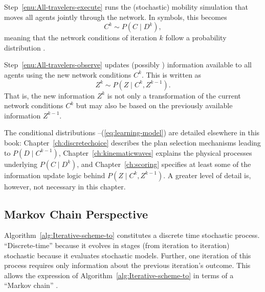
Step~\ref{enu:All-travelers-execute} runs the (stochastic) mobility
simulation that moves all agents jointly through the network. In symbols,
this becomes
\begin{equation}
C^{k}\sim P(C\mid D^{k}),\label{eq:network-loading-model}
\end{equation}\corr{,}{}
meaning that the network conditions of iteration $k$ follow a
probability distribution .

Step~\ref{enu:All-travelers-observe} updates  (possibly
) information available to all agents
using the new network conditions $C^{k}$. This is written as
\begin{equation}
Z^{k}\sim P(Z\mid C^{k},Z^{k-1}).\label{eq:learning-model}
\end{equation}
That is, the new information $Z^{k}$ is not only a transformation
of the current network conditions $C^{k}$\corr{,}{} but may also be based on
the previously available information $Z^{k-1}$.

The conditional distributions --(\ref{eq:learning-model})
are detailed elsewhere in this book: Chapter~\ref{ch:discretechoice} 
describes the plan selection mechanisms leading to $P(D\mid C^{k-1})$,
Chapter~\ref{ch:kinematicwaves} explains the physical processes underlying
$P(C\mid D^{k})$, and Chapter~\ref{ch:scoring}
specifies at least some of the information update logic behind $P(Z\mid
C^{k},Z^{k-1})$.
A greater level of detail is, however, not necessary in this chapter.


\subsection{\label{sub:Markov-chain-perspective}Markov Chain Perspective}

Algorithm~\ref{alg:Iterative-scheme-to} constitutes a discrete time stochastic
process. {}``Discrete-time''\corr{,}{} because it evolves in stages (from
iteration to iteration)\corr{:}{,} stochastic\corr{,}{} because it evaluates
stochastic models. Further, one iteration of this process requires only
information about the previous iteration's outcome. This allows the expression
of Algorithm~\ref{alg:Iterative-scheme-to} in terms of a {}``Markov chain''
\citep{ross-2006}.

